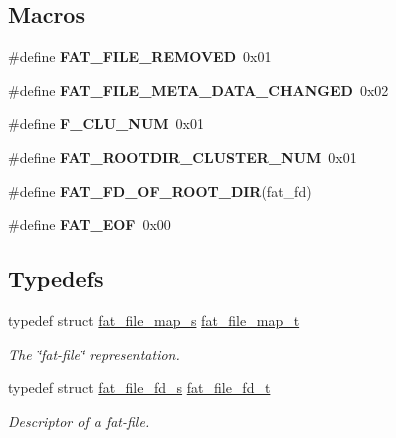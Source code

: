 \subsection*{Macros}
\begin{DoxyCompactItemize}
\item 
\mbox{\label{group__libfs__ff_ga9a993f7a2a73e16b401cdb3c41666193}} 
\#define {\bfseries F\+A\+T\+\_\+\+F\+I\+L\+E\+\_\+\+R\+E\+M\+O\+V\+ED}~0x01
\item 
\mbox{\label{group__libfs__ff_gac4376a84c2a497345f2605a163a1a6bf}} 
\#define {\bfseries F\+A\+T\+\_\+\+F\+I\+L\+E\+\_\+\+M\+E\+T\+A\+\_\+\+D\+A\+T\+A\+\_\+\+C\+H\+A\+N\+G\+ED}~0x02
\item 
\mbox{\label{group__libfs__ff_ga3a947670df0e7846185638b2ddf07725}} 
\#define {\bfseries F\+\_\+\+C\+L\+U\+\_\+\+N\+UM}~0x01
\item 
\mbox{\label{group__libfs__ff_ga86d30980a18e05a1d13f8c8b626dc86a}} 
\#define {\bfseries F\+A\+T\+\_\+\+R\+O\+O\+T\+D\+I\+R\+\_\+\+C\+L\+U\+S\+T\+E\+R\+\_\+\+N\+UM}~0x01
\item 
\#define {\bfseries F\+A\+T\+\_\+\+F\+D\+\_\+\+O\+F\+\_\+\+R\+O\+O\+T\+\_\+\+D\+IR}(fat\+\_\+fd)
\item 
\mbox{\label{group__libfs__ff_ga6546c12ad09d8a707d32a7d9bd3a0acc}} 
\#define {\bfseries F\+A\+T\+\_\+\+E\+OF}~0x00
\end{DoxyCompactItemize}
\subsection*{Typedefs}
\begin{DoxyCompactItemize}
\item 
typedef struct \mbox{\hyperlink{structfat__file__map__s}{fat\+\_\+file\+\_\+map\+\_\+s}} \mbox{\hyperlink{group__libfs__ff_gab16eea01f8ddea275cd616cc28082ff8}{fat\+\_\+file\+\_\+map\+\_\+t}}
\begin{DoxyCompactList}\small\item\em The \char`\"{}fat-\/file\char`\"{} representation. \end{DoxyCompactList}\item 
typedef struct \mbox{\hyperlink{structfat__file__fd__s}{fat\+\_\+file\+\_\+fd\+\_\+s}} \mbox{\hyperlink{group__libfs__ff_gaa53f9c544914509505e3cfbd3796f877}{fat\+\_\+file\+\_\+fd\+\_\+t}}
\begin{DoxyCompactList}\small\item\em Descriptor of a fat-\/file. \end{DoxyCompactList}\end{DoxyCompactItemize}
